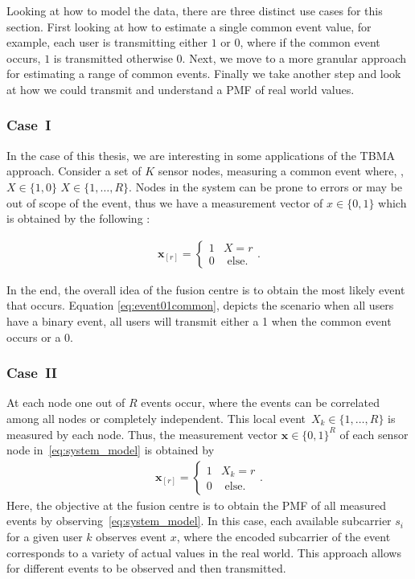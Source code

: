 \documentclass{article}
\begin{document}
Looking at how to model the data, there are three distinct use cases for this section. First looking at how to estimate a single common event value, for example, each user is transmitting either $1$ or $0$, where if the common event occurs, $1$ is transmitted otherwise 0. Next, we move to a more granular approach for estimating a range of common events. Finally we take another step and look at how we could transmit and understand a PMF of real world values. 
\subsubsection{Case~I}

In the case of this thesis, we are interesting in some applications of the TBMA approach. Consider a set of $K$ sensor nodes, measuring a common event where, ,${X \in \{1, 0\}}$ ${X \in \{1, \ldots, R\}}$. Nodes in the system can be prone to errors or may be out of scope of the event, thus we have a measurement vector of ${x \in \{0, 1\}}$ which is obtained by the following :

\begin{align}
    \boldsymbol{x}_{[r]} 
    = 
    \begin{cases}
        1 & X = r
        \\[2ex]
        0 & \text{ else}.
    \end{cases}
    . \label{eq:event01common}
\end{align}

In the end, the overall idea of the fusion centre is to obtain the most likely event that occurs. Equation \ref{eq:event01common}, depicts the scenario when all users have a binary event, all users will transmit either a 1 when the common event occurs or a 0. 

\subsubsection{Case~II}
At each node one out of $R$ events occur, where the events can be correlated among all nodes or completely independent. This local event~${X_k \in \{1, \ldots, R\}}$ is measured by each node. Thus, the measurement vector $\boldsymbol{x} \in \{0,1\}^{R}$ of each sensor node in~\ref{eq:system_model} is obtained by
\begin{align}
    \boldsymbol{x}_{[r]} 
    = 
    \begin{cases}
        1 & X_k = r
        \\[2ex]
        0 & \text{ else}.
    \end{cases}
    . \label{eq:event02independent}
\end{align}
Here, the objective at the fusion centre is to obtain the PMF of all measured events by observing~\ref{eq:system_model}. In this case, each available subcarrier $s_i$ for a given user $k$ observes event $x$, where the encoded subcarrier of the event corresponds to a variety of actual values in the real world. This approach allows for different events to be observed and then transmitted.
\end{document}
